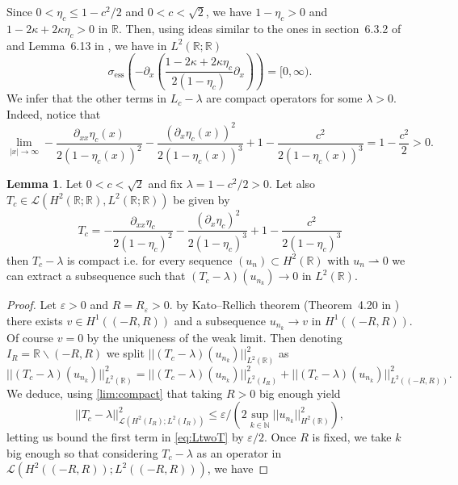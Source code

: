 \documentclass[11pt]{article}
\newcommand{\N}{\mathbb{N}}
\newcommand{\R}{\mathbb{R}}
\theoremstyle{plain}
\theoremstyle{definition}
\newtheorem{lemma}{Lemma}
\theoremstyle{remark}
\numberwithin{equation}{section}
\begin{document}
{	Since $0<\eta_c\leq1-c^2/2$ and $0<c<\sqrt{2}$, we have  $1-\eta_c>0$ and $1-2\kappa+2\kappa\eta_c>0$ in $\R$. Then, using ideas similar to the ones in section~6.3.2  of \cite{spectraltheorybook} and Lemma~6.13 in \cite{spectraltheorybook}, we have in $ L^2(\R;\R)$
	\begin{equation}\label{eq:spectrlaplac}
		\sigma_{\mathrm{ess}}\left(-\partial_x\left(\frac{1-2\kappa+2\kappa\eta_c}{2(1-\eta_c)}\partial_x\right)\right)=[0,\infty).
	\end{equation}
	We infer that the other terms in $L_c-\lambda$ are compact operators for some $\lambda>0$. Indeed, notice that 
	\begin{equation}\label{lim:compact}
		\lim_{|x|\to \infty}-\frac{\partial_{xx}\eta_c(x)}{2(1-\eta_c(x))^2}-\frac{(\partial_x\eta_c(x))^2}{2(1-\eta_c(x))^3}+1-\frac{c^2}{2(1-\eta_c(x))^3}=1-\frac{c^2}{2}>0.
	\end{equation}
	\begin{lemma}\label{lem:Tcompact}
		Let $0<c<\sqrt{2}$ and fix $\lambda=1-c^2/2>0$. Let also $T_c\in\mathcal{L}( H^2(\R;\R), L^2(\R;\R))$ be given by
		\begin{equation}
			T_c=-\frac{\partial_{xx}\eta_c}{2(1-\eta_c)^2}-\frac{(\partial_x\eta_c)^2}{2(1-\eta_c)^3}+1-\frac{c^2}{2(1-\eta_c)^3}
		\end{equation}
		then $T_c-\lambda$ is compact i.e. for every sequence  $(u_n)\subset H^2(\R)$ with $u_n\rightharpoonup0$ we can extract a subsequence such that $(T_c-\lambda)(u_{n_k})\to0$ in $ L^2(\R)$. 
	\end{lemma}
	\begin{proof}
		Let $\varepsilon>0$ and $R=R_\varepsilon>0$.  by   Kato--Rellich theorem (Theorem~4.20 in \cite{spectraltheorybook}) there exists $v\in H^1((-R,R))$ and a subsequence $u_{n_k}\to v$ in $H^1((-R,R))$. Of course $v=0$ by the uniqueness of the weak limit.
		Then denoting $I_R=\R\backslash(-R,R)$  we split  $||(T_c-\lambda)(u_{n_k})||_{ L^2(\R)}^2$ as 
		\begin{equation}\label{eq:LtwoT}
			||(T_c-\lambda)(u_{n_k})||_{ L^2(\R)}^2=||(T_c-\lambda)(u_{n_k})||_{ L^2(I_R)}^2+||(T_c-\lambda)(u_{n_k})||_{ L^2((-R,R))}^2.
		\end{equation}
		We deduce, using \eqref{lim:compact} that taking $R>0$ big enough yield $$||T_c-\lambda||^2_{\mathcal{L}( H^2(I_R); L^2(I_R))}\leq\varepsilon/(2\sup_{k\in\N}||u_{n_k}||^2_{ H^2(\R)}),$$
		letting us bound the first term in \eqref{eq:LtwoT} by $\varepsilon/2$.
		Once $R$ is fixed, we take $k$ big enough so that considering $T_c-\lambda$ as an operator in $\mathcal{L}( H^2((-R,R)); L^2((-R,R)))$, we have 

\end{proof}}
\end{document}
